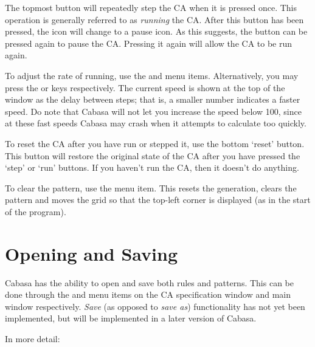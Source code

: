 \documentclass[oneside,a4paper]{memoir}
\begin{document}
The topmost button will repeatedly step the CA when it is pressed once.
This operation is generally referred to as \emph{running} the CA.
After this button has been pressed, the icon will change to a pause icon.
As this suggests, the button can be pressed again to pause the CA.
Pressing it again will allow the CA to be run again.

To adjust the rate of running, use the  and  menu items.
Alternatively, you may press the \keys{{+}} or \keys{-} keys respectively.
The current speed is shown at the top of the window as the delay between steps;
  that is, a smaller number indicates a faster speed.
Do note that Cabasa will not let you increase the speed below 100,
  since at these fast speeds Cabasa may crash when it attempts to calculate too quickly.

To reset the CA after you have run or stepped it, use the bottom `reset' button.
This button will restore the original state of the CA after you have pressed the `step' or `run' buttons.
If you haven't run the CA, then it doesn't do anything.

To clear the pattern, use the  menu item.
This resets the generation, clears the pattern and moves the grid so that the top-left corner is displayed
  (as in the start of the program).

\section{Opening and Saving}
\label{sec:opsav}

Cabasa has the ability to open and save both rules and patterns.
This can be done through the  and  menu items on the CA specification window and main window respectively.
\textit{Save} (as opposed to \textit{save as}) functionality has not yet been implemented, but will be implemented in a later version of Cabasa.

In more detail:
\end{document}

